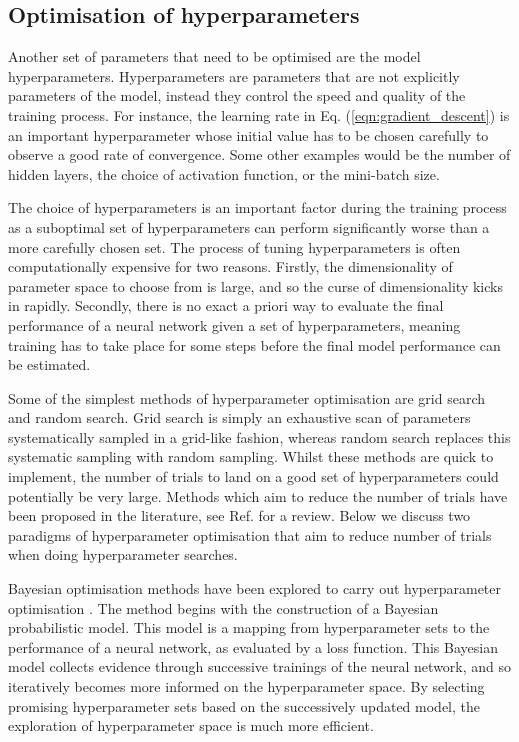 \documentclass[main.tex]{subfiles}
\begin{document}
    \subsection{Optimisation of hyperparameters}
    Another set of parameters that need to be optimised
    are the model hyperparameters.
    Hyperparameters are parameters that are
    not explicitly parameters of the model, instead they control
    the speed and quality of the training process.
    For instance, the learning rate in Eq. ({\ref{eqn:gradient_descent}}) is
    an important hyperparameter whose initial value has
    to be chosen carefully to observe a good rate of convergence.
    Some other examples would be
    the number of hidden layers, the choice of activation
    function, or the mini-batch size.

    The choice of hyperparameters is an important
    factor during the training process as a suboptimal set
    of hyperparameters can perform significantly worse
    than a more carefully chosen set. The process of tuning
    hyperparameters is often computationally expensive for two
    reasons. Firstly, the dimensionality of parameter space to choose from is large,
    and so the curse of dimensionality kicks in rapidly.
    Secondly, there is no exact a priori way to evaluate the
    final performance of a neural network given a set of
    hyperparameters, meaning training has to take place for
    some steps before the final model performance can be estimated.
    
    Some of the simplest methods of hyperparameter optimisation
    are grid search and random search. Grid search is simply
    an exhaustive scan of parameters systematically sampled
    in a grid-like fashion, whereas random search replaces
    this systematic sampling with random sampling. Whilst
    these methods are quick to implement, the number of trials
    to land on a good set of hyperparameters could potentially
    be very large. Methods which aim to reduce the number
    of trials have been proposed in the literature, see Ref.
    \cite{Yu2020HyperParameterOA} for a review.
    Below we discuss two paradigms of hyperparameter optimisation
    that aim to reduce number of trials when doing hyperparameter searches.

    Bayesian optimisation methods have been explored
    to carry out hyperparameter optimisation \cite{bergstra2013making,bergstra2015hyperopt}.
    The method begins with the construction of a 
    Bayesian probabilistic model. This model is a mapping
    from hyperparameter sets to the performance
    of a neural network, as evaluated by a loss function. 
    This Bayesian model collects evidence
    through successive trainings of the neural network,
    and so iteratively becomes more informed on the hyperparameter
    space. By selecting promising hyperparameter
    sets based on the successively updated model, the exploration of
    hyperparameter space is much more efficient.
\end{document}

